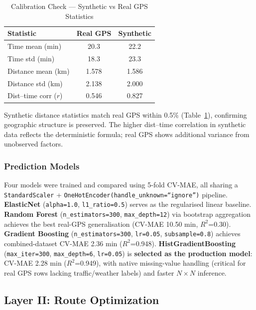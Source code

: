 \documentclass[conference]{IEEEtran}
\newcommand{\mar}[1]{\textcolor{black!90!white}{#1}}
\begin{document}
\begin{table}[H]
\centering
\caption{Calibration Check — Synthetic vs Real GPS Statistics}
\label{tab:calibration}
\begin{tabular}{|l|c|c|}
\hline
\textbf{Statistic} & \textbf{Real GPS} & \textbf{Synthetic} \\ \hline
Time mean (min)       & 20.3 & 22.2 \\ \hline
Time std (min)        & 18.3 & 23.3 \\ \hline
Distance mean (km)    & 1.578 & 1.586 \\ \hline
Distance std (km)     & 2.138 & 2.000 \\ \hline
Dist--time corr ($r$) & 0.546 & 0.827 \\ \hline
\end{tabular}
\end{table}

Synthetic distance statistics match real GPS within 0.5\% (Table~\ref{tab:calibration}),
confirming geographic structure is preserved. The higher dist--time correlation
in synthetic data reflects the deterministic formula; real GPS shows additional
variance from unobserved factors.

\mar{\subsubsection{Prediction Models}}

Four models were trained and compared using 5-fold CV-MAE, all sharing a
\texttt{StandardScaler} + \texttt{OneHotEncoder(handle\_unknown=``ignore'')}
pipeline. \textbf{ElasticNet} (\texttt{alpha=1.0}, \texttt{l1\_ratio=0.5})
serves as the regularised linear baseline. \textbf{Random Forest}
(\texttt{n\_estimators=300}, \texttt{max\_depth=12}) via bootstrap aggregation
achieves the best real-GPS generalisation (CV-MAE 10.50 min, $R^2$=0.30).
\textbf{Gradient Boosting} (\texttt{n\_estimators=300}, \texttt{lr=0.05},
\texttt{subsample=0.8}) achieves combined-dataset CV-MAE 2.36 min ($R^2$=0.948).
\textbf{HistGradientBoosting} (\texttt{max\_iter=300},
\texttt{max\_depth=6}, \texttt{lr=0.05}) is \textbf{selected as the
production model}: CV-MAE 2.28 min ($R^2$=0.949), with native missing-value
handling (critical for real GPS rows lacking traffic/weather
labels) and faster $N\!\times\!N$ inference.

\mar{\subsection{Layer II: Route Optimization}}
\end{document}
